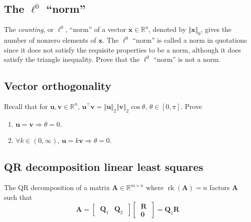 \documentclass{article}
\numberwithin{equation}{section}
\begin{document}
\subsection{The $ \ell^0 $ ``norm''}

The \textit{counting}, or $ \ell^0 $, ``norm'' of a vector $ \mathbf{x} \in
\mathbb{R}^n $, denoted by $ \Vert\mathbf{x}\Vert_0 $, gives the number of
nonzero elements of $ \mathbf{x} $. The $ \ell^0 $ ``norm'' is called a norm
in quotations since it does not satisfy the requisite properties to be a norm,
although it does satisfy the triangle inequality. Prove that the $ \ell^0 $
``norm'' is not a norm.

\subsection{Vector orthogonality}

Recall that for $ \mathbf{u}, \mathbf{v} \in \mathbb{R}^n $,
$ \mathbf{u}^\top\mathbf{v} = \Vert\mathbf{u}\Vert_2\Vert\mathbf{v}\Vert_2
\cos\theta $, $ \theta \in [0, \pi] $. Prove
\begin{enumerate}[label = \alph*.]
    \item
    $ \mathbf{u} = \mathbf{v} \Rightarrow \theta = 0 $.

    \item
    $ \forall k \in (0, \infty) $, $ \mathbf{u} = k\mathbf{v} \Rightarrow
    \theta = 0 $.
\end{enumerate}

\medskip

\subsection{QR decomposition linear least squares}

The QR decomposition of a matrix $ \mathbf{A} \in \mathbb{R}^{m \times n} $
where $ \operatorname{rk}(\mathbf{A}) = n $ factors $ \mathbf{A} $ such that
\cite{bv_convex_opt}
\begin{equation*}
    \mathbf{A} = \begin{bmatrix} \ \mathbf{Q}_1 & \mathbf{Q}_2 \ \end{bmatrix}
    \begin{bmatrix} \ \mathbf{R} \ \\ \ \mathbf{0} \ \end{bmatrix}
     = \mathbf{Q}_1\mathbf{R}
\end{equation*}
\end{document}
